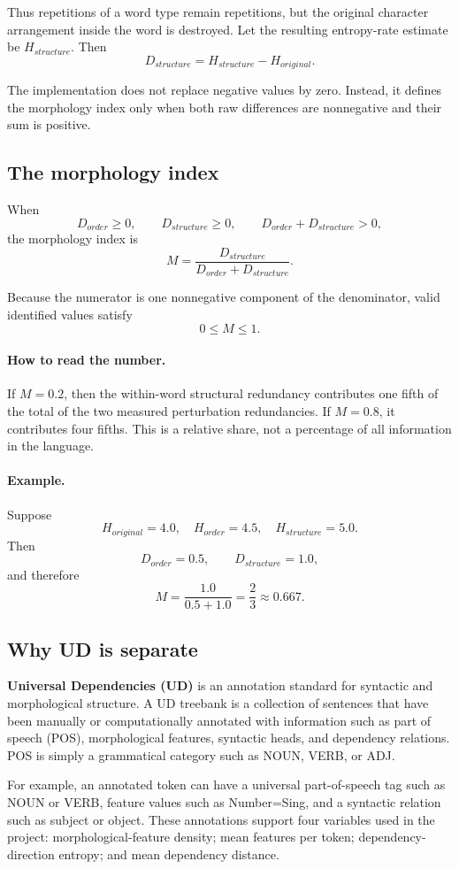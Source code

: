 \documentclass[11pt]{article}
\begin{document}
Thus repetitions of a word type remain repetitions, but the original character arrangement inside the word is destroyed. Let the resulting entropy-rate estimate be $H_{structure}$. Then
\[
\boxed{D_{structure}=H_{structure}-H_{original}.}
\]

The implementation does not replace negative values by zero. Instead, it defines the morphology index only when both raw differences are nonnegative and their sum is positive.

\subsection{The morphology index}
When
\[
D_{order}\ge0,\qquad D_{structure}\ge0,\qquad D_{order}+D_{structure}>0,
\]
the morphology index is
\[
\boxed{
M=\frac{D_{structure}}{D_{order}+D_{structure}}.
}
\]

Because the numerator is one nonnegative component of the denominator, valid identified values satisfy
\[
0\le M\le1.
\]

\paragraph{How to read the number.}
If $M=0.2$, then the within-word structural redundancy contributes one fifth of the total of the two measured perturbation redundancies. If $M=0.8$, it contributes four fifths. This is a relative share, not a percentage of all information in the language.

\paragraph{Example.}
Suppose
\[
H_{original}=4.0,\quad H_{order}=4.5,\quad H_{structure}=5.0.
\]
Then
\[
D_{order}=0.5,\qquad D_{structure}=1.0,
\]
and therefore
\[
M=\frac{1.0}{0.5+1.0}=\frac23\approx0.667.
\]

\subsection{Why UD is separate}
\textbf{Universal Dependencies (UD)} is an annotation standard for syntactic and morphological structure. A UD treebank is a collection of sentences that have been manually or computationally annotated with information such as part of speech (POS), morphological features, syntactic heads, and dependency relations. POS is simply a grammatical category such as NOUN, VERB, or ADJ.

For example, an annotated token can have a universal part-of-speech tag such as NOUN or VERB, feature values such as Number=Sing, and a syntactic relation such as subject or object. These annotations support four variables used in the project: morphological-feature density; mean features per token; dependency-direction entropy; and mean dependency distance.
\end{document}

